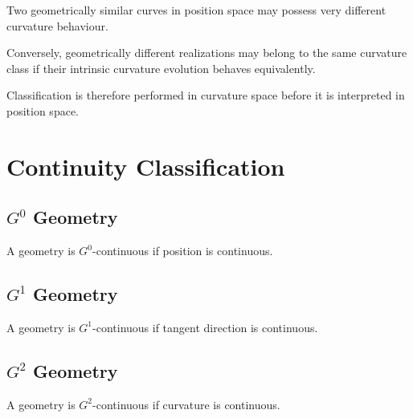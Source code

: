 Two geometrically similar curves in position space may possess very
different curvature behaviour.

Conversely, geometrically different realizations may belong to the same
curvature class if their intrinsic curvature evolution behaves
equivalently.

Classification is therefore performed in curvature space before it is
interpreted in position space.

\section{Continuity Classification}

\subsection{\texorpdfstring{$G^0$}{G0} Geometry}

\begin{definition}
\label{def:g0-geometry}
A geometry is \(G^0\)-continuous if position is continuous.
\end{definition}


\subsection{\texorpdfstring{$G^1$}{G1} Geometry}

\begin{definition}
\label{def:g1-geometry}
A geometry is \(G^1\)-continuous if tangent direction is continuous.
\end{definition}


\subsection{\texorpdfstring{$G^2$}{G2} Geometry}

\begin{definition}
\label{def:g2-geometry}
A geometry is \(G^2\)-continuous if curvature is continuous.
\end{definition}

